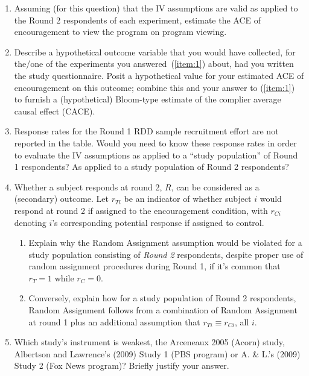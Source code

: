 \documentclass{article}
\begin{document}
\begin{enumerate}
\item \label{item:1}Assuming (for this question) that the IV assumptions are valid as applied to the Round 2 respondents of each experiment, estimate the ACE of encouragement to view the program on program viewing.
\item Describe a hypothetical outcome variable that you would have collected, for the/one of the experiments you answered~(\ref{item:1}) about,  had you written the study questionnaire. Posit a hypothetical value for your estimated ACE of encouragement on this outcome; combine this and your answer to (\ref{item:1}) to furnish a (hypothetical) Bloom-type estimate of the complier average causal effect (CACE).  
\item Response rates for the Round 1 RDD sample recruitment effort are not reported in the table. Would you need to know these response rates in order to evaluate the IV assumptions as applied to a ``study population'' of Round 1 respondents?  As applied to a study population of Round 2 respondents? 
\item Whether a subject responds at round 2, $R$, can be considered as a (secondary) outcome. Let $r_{Ti}$ be an indicator of whether subject $i$ would respond at round 2 if assigned to the encouragement condition, with $r_{Ci}$ denoting $i$'s corresponding potential response if assigned to control.
  \begin{enumerate}
  \item Explain why the Random Assignment assumption would be violated for a study population consisting of \textit{Round 2} respondents, despite proper use of random assignment procedures during Round 1, if it's common that $r_{T}=1$ while $r_{C}=0$.
  \item Conversely, explain how for a study population of Round 2 respondents, Random Assignment follows from a combination of Random Assignment at round 1 plus an additional assumption that $r_{Ti} \equiv r_{Ci}$, all $i$. 
  \end{enumerate}
\item Which study's instrument is weakest, the Arceneaux 2005 (Acorn) study, Albertson and Lawrence's (2009) Study 1 (PBS program) or A. \& L.'s (2009) Study 2 (Fox News program)? Briefly justify your answer.
\end{enumerate}
\end{document}
